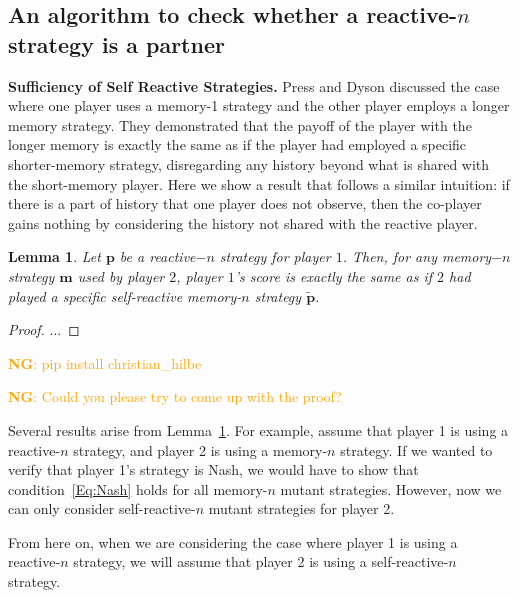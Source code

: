 \documentclass[11pt]{article}
\newcommand{\nikoleta}[1]{\textcolor{orange}{\textbf{NG}: #1}}
\theoremstyle{plainCl1}
\newtheorem{lemma}[theorem]{Lemma}
\theoremstyle{plainCl2}
\begin{document}

\subsection{An algorithm to check whether a reactive-$n$ strategy is a partner}

{\bf Sufficiency of Self Reactive Strategies.}
Press and Dyson \cite{press:PNAS:2012} discussed the case where one player uses a memory-1
strategy and the other player employs a longer memory strategy. They
demonstrated that the payoff of the player with the longer memory is exactly the
same as if the player had employed a specific shorter-memory strategy,
disregarding any history beyond what is shared with the short-memory player.
Here we show a result that follows a similar intuition: if there is a part of
history that one player does not observe, then the co-player gains nothing by
considering the history not shared with the reactive player.

\begin{lemma}\label{lemma:self_reactive_sufficiency}
  Let $\mathbf{p}$ be a reactive$-n$ strategy for player $1$. Then, for any
  memory$-n$ strategy $\mathbf{m}$ used by player $2$, player $1$'s score is
  exactly the same as if $2$ had played a specific self-reactive memory-$n$
  strategy $\mathbf{\tilde{p}}$.
\end{lemma}

\begin{proof}
$\dots$
\end{proof}

\nikoleta{pip install christian\_hilbe}

\nikoleta{Could you please try to come up with the proof?}

Several results arise from Lemma~\ref{lemma:self_reactive_sufficiency}. For
example, assume that player 1 is using a reactive-$n$ strategy, and player 2 is
using a memory-$n$ strategy. If we wanted to verify that player 1's strategy is
Nash, we would have to show that condition~\eqref{Eq:Nash} holds for all
memory-$n$ mutant strategies. However, now we can only consider
self-reactive-$n$ mutant strategies for player 2.

From here on, when we are considering the case where player 1 is using a
reactive-$n$ strategy, we will assume that player 2 is using a self-reactive-$n$
strategy.
\end{document}
